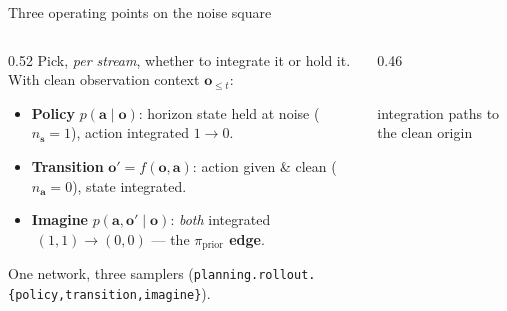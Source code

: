 \documentclass[aspectratio=169]{beamer}
\newcommand{\obs}{\bm{o}}
\newcommand{\act}{\bm{a}}
\newcommand{\state}{\bm{s}}
\newcommand{\prior}{\pi_{\mathrm{prior}}}
\begin{document}
\begin{frame}{Three operating points on the noise square}
  \begin{columns}[T]
    \begin{column}{0.52\textwidth}
      Pick, \emph{per stream}, whether to integrate it or hold it. With clean
      observation context $\obs_{\le t}$:
      \begin{itemize}\small
        \item \textbf{Policy} $p(\act\mid\obs)$: horizon state held at noise
          ($n_{\state}\!=\!1$), action integrated $1\!\to\!0$.
        \item \textbf{Transition} $\obs' \!=\! f(\obs,\act)$: action given \&
          clean ($n_{\act}\!=\!0$), state integrated.
        \item \textbf{Imagine} $p(\act,\obs'\mid\obs)$: \emph{both} integrated
          $\;(1,1)\!\to\!(0,0)$ --- the \textbf{$\prior$ edge}.
      \end{itemize}
      \vspace{0.4em}
      One network, three samplers
      (\texttt{planning.rollout.\{policy,transition,imagine\}}).
    \end{column}
    \begin{column}{0.46\textwidth}
      \centering
      \\[-0.2em]{\scriptsize integration paths to the clean origin}
    \end{column}
  \end{columns}
\end{frame}
\end{document}
